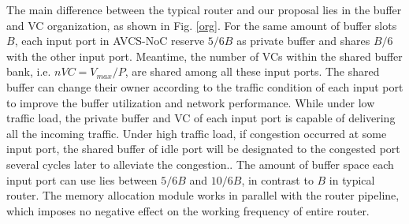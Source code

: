 \documentclass[10pt,conference]{IEEEtran}
\begin{document}
The main difference between the typical router and our proposal lies in the buffer and VC organization, as shown in Fig. \ref{org}. For the same amount of buffer slots $B$, each input port in AVCS-NoC reserve $5/6B$ as private buffer and shares $B/6$ with the other input port. Meantime, the number of VCs within the shared buffer bank, i.e. $nVC=V_{max}/P$, are shared among all these input ports. The shared buffer can change their owner according to the traffic condition of each input port to improve the buffer utilization and network performance. While under low traffic load, the private buffer and VC of each input port is capable of delivering all the incoming traffic. Under high traffic load, if congestion occurred at some input port, the shared buffer of idle port will be designated to the congested port several cycles later to alleviate the congestion.. The amount of buffer space each input port can use lies between $5/6B$ and $10/6B$, in contrast to $B$ in typical router. The memory allocation module works in parallel with the router pipeline, which imposes no negative effect on the working frequency of entire router.

\end{document}
